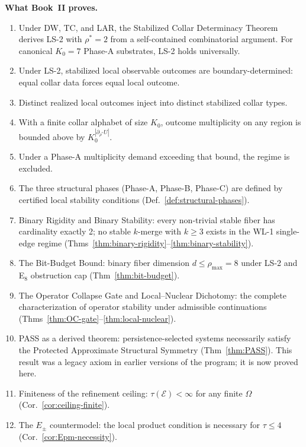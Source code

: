 \documentclass[12pt,oneside]{amsbook}
\theoremstyle{plain}
\theoremstyle{definition}
\theoremstyle{remark}
\begin{document}
\textbf{What Book~II proves.}
\begin{enumerate}
  \item Under DW, TC, and LAR, the Stabilized Collar Determinacy
        Theorem derives LS-2 with $\rho^* = 2$ from a self-contained
        combinatorial argument.  For canonical $K_0 = 7$ Phase-A
        substrates, LS-2 holds universally.
  \item Under LS-2, stabilized local observable outcomes are
        boundary-determined: equal collar data forces equal local
        outcome.
  \item Distinct realized local outcomes inject into distinct
        stabilized collar types.
  \item With a finite collar alphabet of size $K_0$, outcome
        multiplicity on any region is bounded above by
        $K_0^{|\partial_{\rho^*}U|}$.
  \item Under a Phase-A multiplicity demand exceeding that bound, the
        regime is excluded.
  \item The three structural phases (Phase-A, Phase-B, Phase-C) are
        defined by certified local stability conditions
        (Def.~\ref{def:structural-phases}).
  \item Binary Rigidity and Binary Stability: every non-trivial stable
        fiber has cardinality exactly 2; no stable $k$-merge with
        $k \geq 3$ exists in the WL-1 single-edge regime
        (Thms~\ref{thm:binary-rigidity}--\ref{thm:binary-stability}).
  \item The Bit-Budget Bound: binary fiber dimension
        $d \leq \rho_{\max} = 8$ under LS-2 and E${}_8$ obstruction cap
        (Thm~\ref{thm:bit-budget}).
  \item The Operator Collapse Gate and Local--Nuclear Dichotomy:
        the complete characterization of operator stability under
        admissible continuations
        (Thms~\ref{thm:OC-gate}--\ref{thm:local-nuclear}).
  \item PASS as a derived theorem: persistence-selected systems
        necessarily satisfy the Protected Approximate Structural
        Symmetry (Thm~\ref{thm:PASS}).  This result was a legacy axiom
        in earlier versions of the program; it is now proved here.
  \item Finiteness of the refinement ceiling: $\tau(\mathcal{E}) <
        \infty$ for any finite $\Omega$
        (Cor.~\ref{cor:ceiling-finite}).
  \item The $E_\pm$ countermodel: the local product condition is
        necessary for $\tau \leq 4$
        (Cor.~\ref{cor:Epm-necessity}).
\end{enumerate}
\end{document}
